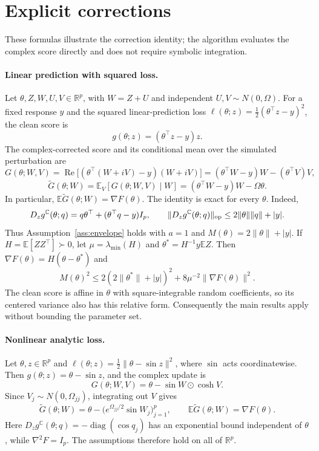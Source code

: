 \section{Explicit corrections}
\label{sec:examples}

These formulas illustrate the correction identity; the algorithm evaluates
the complex score directly and does not require symbolic integration.

\paragraph{Linear prediction with squared loss.}
Let $\theta,Z,W,U,V\in\mathbb R^p$, with $W=Z+U$ and independent
$U,V\sim N(0,\Omega)$. For a fixed response $y$ and the squared
linear-prediction loss
$\ell(\theta;z)=\tfrac12(\theta^\top z-y)^2$, the clean score is
\[
g(\theta;z)=(\theta^\top z-y)z.
\]
The complex-corrected score and its conditional mean over the simulated
perturbation are
\[
G(\theta;W,V)
=\operatorname{Re}\bigl[(\theta^\top(W+iV)-y)(W+iV)\bigr]
=(\theta^\top W-y)W-(\theta^\top V)V,
\]
\[
\widetilde G(\theta;W)
=\mathbb E_V[G(\theta;W,V)\mid W]
=(\theta^\top W-y)W-\Omega\theta.
\]
In particular, $\mathbb E\widetilde G(\theta;W)=\nabla F(\theta)$.
The identity is exact for every $\theta$. Indeed,
\[
D_zg^{\mathbb C}(\theta;q)
=q\theta^\top+(\theta^\top q-y)I_p,
\qquad
\|D_zg^{\mathbb C}(\theta;q)\|_{\rm op}
\le2\|\theta\|\|q\|+|y|.
\]
Thus Assumption~\ref{ass:envelope} holds with $a=1$ and
$M(\theta)=2\|\theta\|+|y|$. If
$H=\mathbb E[ZZ^\top]\succ0$, let $\mu=\lambda_{\min}(H)$ and
$\theta^*=H^{-1}y\mathbb EZ$. Then
$\nabla F(\theta)=H(\theta-\theta^*)$ and
\[
M(\theta)^2\le
2(2\|\theta^*\|+|y|)^2+8\mu^{-2}\|\nabla F(\theta)\|^2.
\]
The clean score is affine in $\theta$ with square-integrable random
coefficients, so its centered variance also has this relative form.
Consequently the main results apply without bounding the parameter set.

\paragraph{Nonlinear analytic loss.}
Let $\theta,z\in\mathbb R^p$ and
$\ell(\theta;z)=\tfrac12\|\theta-\sin z\|^2$, where $\sin$ acts
coordinatewise. Then $g(\theta;z)=\theta-\sin z$, and the complex update is
\[
G(\theta;W,V)=\theta-\sin W\odot\cosh V.
\]
Since $V_j\sim N(0,\Omega_{jj})$, integrating out $V$ gives
\[
\widetilde G(\theta;W)
=\theta-\bigl(e^{\Omega_{jj}/2}\sin W_j\bigr)_{j=1}^p,
\qquad
\mathbb E\widetilde G(\theta;W)=\nabla F(\theta).
\]
Here $D_zg^{\mathbb C}(\theta;q)=-\operatorname{diag}(\cos q_j)$
has an exponential bound independent of $\theta$, while
$\nabla^2F=I_p$. The assumptions therefore hold on all of $\mathbb R^p$.
